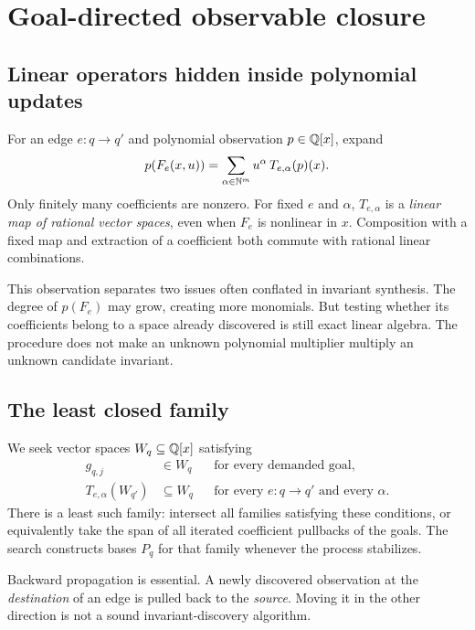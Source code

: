 \section{Goal-directed observable closure}
\label{sec:algorithm}

\subsection{Linear operators hidden inside polynomial updates}
For an edge $e:q\to q'$ and polynomial observation $p\in\mathbb Q[x]$, expand
\begin{equation}\label{eq:coefficient}
 p(F_e(x,u))=\sum_{\alpha\in\mathbb N^m}u^\alpha\,T_{e,\alpha}(p)(x).
\end{equation}
Only finitely many coefficients are nonzero. For fixed $e$ and $\alpha$,
$T_{e,\alpha}$ is a \emph{linear map of rational vector spaces}, even when
$F_e$ is nonlinear in $x$. Composition with a fixed map and extraction of a
coefficient both commute with rational linear combinations.

This observation separates two issues often conflated in invariant synthesis.
The degree of $p(F_e)$ may grow, creating more monomials. But testing whether
its coefficients belong to a space already discovered is still exact linear
algebra. The procedure does not make an unknown polynomial multiplier multiply
an unknown candidate invariant.

\subsection{The least closed family}
We seek vector spaces $W_q\subseteq\mathbb Q[x]$ satisfying
\begin{align}
 g_{q,j}&\in W_q &&\text{for every demanded goal},\label{eq:contain}\\
 T_{e,\alpha}(W_{q'})&\subseteq W_q
 &&\text{for every }e:q\to q'\text{ and every }\alpha.\label{eq:closed}
\end{align}
There is a least such family: intersect all families satisfying these
conditions, or equivalently take the span of all iterated coefficient
pullbacks of the goals. The search constructs bases $P_q$ for that family
whenever the process stabilizes.

Backward propagation is essential. A newly discovered observation at the
\emph{destination} of an edge is pulled back to the \emph{source}. Moving it
in the other direction is not a sound invariant-discovery algorithm.

